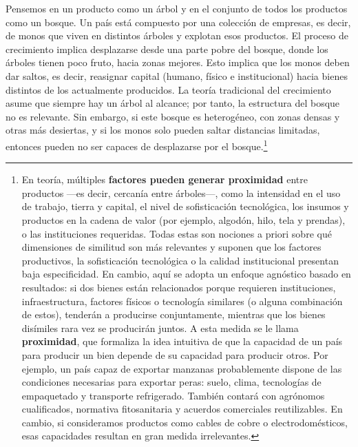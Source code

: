 \documentclass[10pt,a4paper]{article}
\begin{document}
Pensemos en un producto como un árbol y en el conjunto de todos los productos como un bosque. Un país está compuesto por una colección de empresas, es decir, de monos que viven en distintos árboles y explotan esos productos. El proceso de crecimiento implica desplazarse desde una parte pobre del bosque, donde los árboles tienen poco fruto, hacia zonas mejores. Esto implica que los monos deben dar saltos, es decir, reasignar capital (humano, físico e institucional) hacia bienes distintos de los actualmente producidos. La teoría tradicional del crecimiento asume que siempre hay un árbol al alcance; por tanto, la estructura del bosque no es relevante. Sin embargo, si este bosque es heterogéneo, con zonas densas y otras más desiertas, y si los monos solo pueden saltar distancias limitadas, entonces pueden no ser capaces de desplazarse por el bosque.\footnote{%
    En teoría, múltiples \textbf{factores pueden generar proximidad} entre productos —es decir, cercanía entre árboles—, como la intensidad en el uso de trabajo, tierra y capital, el nivel de sofisticación tecnológica, los insumos y productos en la cadena de valor (por ejemplo, algodón, hilo, tela y prendas), o las instituciones requeridas. Todas estas son nociones a priori sobre qué dimensiones de similitud son más relevantes y suponen que los factores productivos, la sofisticación tecnológica o la calidad institucional presentan baja especificidad. En cambio, aquí se adopta un enfoque agnóstico basado en resultados: si dos bienes están relacionados porque requieren instituciones, infraestructura, factores físicos o tecnología similares (o alguna combinación de estos), tenderán a producirse conjuntamente, mientras que los bienes disímiles rara vez se producirán juntos. A esta medida se le llama \textbf{proximidad}, que formaliza la idea intuitiva de que la capacidad de un país para producir un bien depende de su capacidad para producir otros. Por ejemplo, un país capaz de exportar manzanas probablemente dispone de las condiciones necesarias para exportar peras: suelo, clima, tecnologías de empaquetado y transporte refrigerado. También contará con agrónomos cualificados, normativa fitosanitaria y acuerdos comerciales reutilizables. En cambio, si consideramos productos como cables de cobre o electrodomésticos, esas capacidades resultan en gran medida irrelevantes.
}
\end{document}
